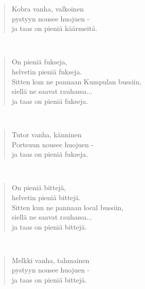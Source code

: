 \noindent\begin{minipage}{\linewidth}
\begin{verse}
	Kobra vanha, valkoinen\\
	pystyyn nousee huojuen -\\
	ja taas on pieniä käärmeitä.\\
\end{verse}
\end{minipage}\\[10pt]
\noindent\begin{minipage}{\linewidth}
\begin{verse}
	On pieniä fukseja,\\
	helvetin pieniä fukseja.\\
	Sitten kun ne pannaan Kumpulan bussiin,\\
	siellä ne saavat rauhassa...\\
	ja taas on pieniä fukseja.\\
\end{verse}
\end{minipage}\\[10pt]
\noindent\begin{minipage}{\linewidth}
\begin{verse}
	Tutor vanha, känninen\\
	Portsuun nousee huojuen -\\
	ja taas on pieniä fukseja.\\
\end{verse}
\end{minipage}\\[10pt]
\noindent\begin{minipage}{\linewidth}
\begin{verse}
	On pieniä bittejä,\\
	helvetin pieniä bittejä.\\
	Sitten kun ne pannaan local bussiin,\\
	siellä ne saavat rauhassa...\\
	ja taas on pieniä bittejä.\\
\end{verse}
\end{minipage}\\[10pt]
\noindent\begin{minipage}{\linewidth}
\begin{verse}
	Melkki vanha, tahmainen\\
	pystyyn nousee huojuen -\\
	ja taas on pieniä bittejä.\\
\end{verse}
\end{minipage}\\[10pt]
